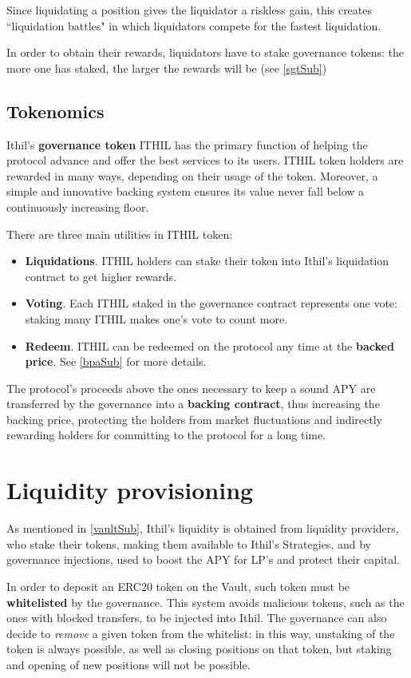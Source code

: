 \documentclass[a4paper,10 pt]{article}
\theoremstyle{definition}
\begin{document}
Since liquidating a position gives the liquidator a riskless gain, this creates ``liquidation battles" in which liquidators compete for the fastest liquidation.

In order to obtain their rewards, liquidators have to stake governance tokens: the more one has staked, the larger the rewards will be (see \ref{sgtSub})

\subsection{Tokenomics}\label{tokSub}

Ithil's {\bf governance token} ITHIL has the primary function of helping the protocol advance and offer the best services to its users. ITHIL token holders are rewarded in many ways, depending on their usage of the token. Moreover, a simple and innovative backing system ensures its value never fall below a continuously increasing floor.

There are three main utilities in ITHIL token:
\begin{itemize}
\item {\bf Liquidations}. ITHIL holders can stake their token into Ithil's liquidation contract to get higher rewards.
\item {\bf Voting}. Each ITHIL staked in the governance contract represents one vote: staking many ITHIL makes one's vote to count more.
\item {\bf Redeem}. ITHIL can be redeemed on the protocol any time at the {\bf backed price}. See \ref{bpaSub} for more details. 
\end{itemize}
The protocol's proceeds above the ones necessary to keep a sound APY are transferred by the governance into a {\bf backing contract}, thus increasing the backing price, protecting the holders from market fluctuations and indirectly rewarding holders for committing to the protocol for a long time.

\section{Liquidity provisioning}\label{liquidityProvSec}
As mentioned in \ref{vaultSub}, Ithil's liquidity is obtained from liquidity providers, who stake their tokens, making them available to Ithil's Strategies, and by governance injections, used to boost the APY for LP's and protect their capital.

In order to deposit an ERC20 token on the Vault, such token must be {\bf whitelisted} by the governance. This system avoids malicious tokens, such as the ones with blocked transfers, to be injected into Ithil. The governance can also decide to {\it remove} a given token from the whitelist: in this way, unstaking of the token is always possible, as well as closing positions on that token, but staking and opening of new positions will not be possible.
\end{document}
